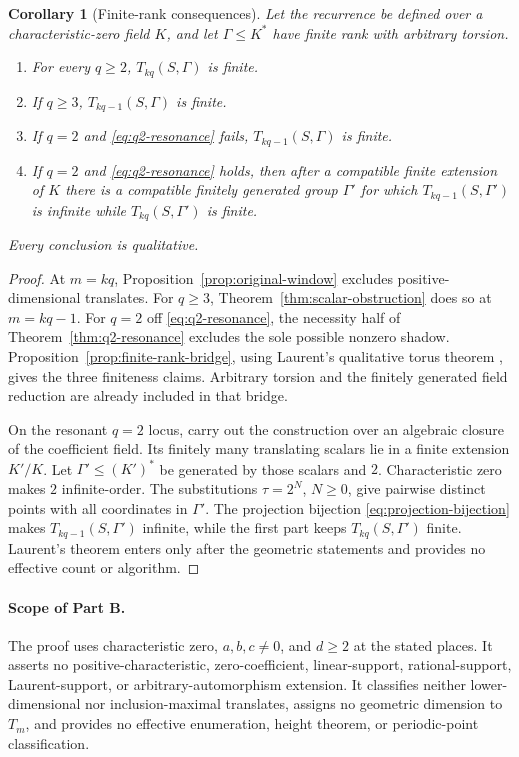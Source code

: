 \documentclass[11pt]{article}
\newtheorem{corollary}[lemma]{Corollary}
\theoremstyle{remark}
\numberwithin{equation}{section}
\begin{document}
\begin{corollary}[Finite-rank consequences]\label{cor:finite-rank-consequences}
Let the recurrence be defined over a characteristic-zero field \(K\), and let \(\Gamma\leq K^\ast\) have finite rank with arbitrary torsion.
\begin{enumerate}
\item For every \(q\geq2\), \(T_{kq}(S,\Gamma)\) is finite.
\item If \(q\geq3\), \(T_{kq-1}(S,\Gamma)\) is finite.
\item If \(q=2\) and \eqref{eq:q2-resonance} fails, \(T_{kq-1}(S,\Gamma)\) is finite.
\item If \(q=2\) and \eqref{eq:q2-resonance} holds, then after a compatible finite extension of \(K\) there is a compatible finitely generated group \(\Gamma'\) for which \(T_{kq-1}(S,\Gamma')\) is infinite while \(T_{kq}(S,\Gamma')\) is finite.
\end{enumerate}
Every conclusion is qualitative.
\end{corollary}

\begin{proof}
At \(m=kq\), Proposition~\ref{prop:original-window} excludes positive-dimensional translates.  For \(q\geq3\), Theorem~\ref{thm:scalar-obstruction} does so at \(m=kq-1\).  For \(q=2\) off \eqref{eq:q2-resonance}, the necessity half of Theorem~\ref{thm:q2-resonance} excludes the sole possible nonzero shadow.  Proposition~\ref{prop:finite-rank-bridge}, using Laurent's qualitative torus theorem \citep{laurent1984equations}, gives the three finiteness claims.  Arbitrary torsion and the finitely generated field reduction are already included in that bridge.

On the resonant \(q=2\) locus, carry out the construction over an algebraic closure of the coefficient field.  Its finitely many translating scalars lie in a finite extension \(K'/K\).  Let \(\Gamma'\leq(K')^\ast\) be generated by those scalars and \(2\).  Characteristic zero makes \(2\) infinite-order.  The substitutions \(\tau=2^N\), \(N\geq0\), give pairwise distinct points with all coordinates in \(\Gamma'\).  The projection bijection \eqref{eq:projection-bijection} makes \(T_{kq-1}(S,\Gamma')\) infinite, while the first part keeps \(T_{kq}(S,\Gamma')\) finite.  Laurent's theorem enters only after the geometric statements and provides no effective count or algorithm.
\end{proof}

\paragraph{Scope of Part B.}
The proof uses characteristic zero, \(a,b,c\neq0\), and \(d\geq2\) at the stated places.  It asserts no positive-characteristic, zero-coefficient, linear-support, rational-support, Laurent-support, or arbitrary-automorphism extension.  It classifies neither lower-dimensional nor inclusion-maximal translates, assigns no geometric dimension to \(T_m\), and provides no effective enumeration, height theorem, or periodic-point classification.
\end{document}
